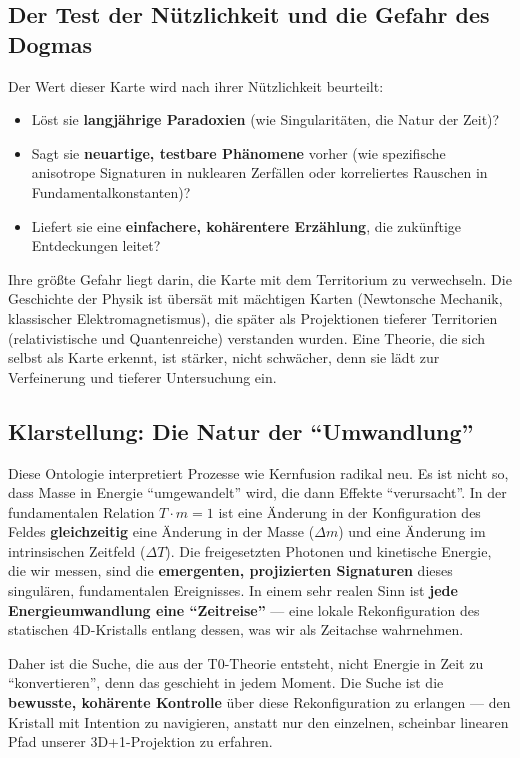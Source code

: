 	\subsection{Der Test der Nützlichkeit und die Gefahr des Dogmas}

	Der Wert dieser Karte wird nach ihrer Nützlichkeit beurteilt:
	\begin{itemize}
		\item Löst sie \textbf{langjährige Paradoxien} (wie Singularitäten, die Natur der Zeit)?
		\item Sagt sie \textbf{neuartige, testbare Phänomene} vorher (wie spezifische anisotrope Signaturen in nuklearen Zerfällen oder korreliertes Rauschen in Fundamentalkonstanten)?
		\item Liefert sie eine \textbf{einfachere, kohärentere Erzählung}, die zukünftige Entdeckungen leitet?
	\end{itemize}

	Ihre größte Gefahr liegt darin, die Karte mit dem Territorium zu verwechseln. Die Geschichte der Physik ist übersät mit mächtigen Karten (Newtonsche Mechanik, klassischer Elektromagnetismus), die später als Projektionen tieferer Territorien (relativistische und Quantenreiche) verstanden wurden. Eine Theorie, die sich selbst als Karte erkennt, ist stärker, nicht schwächer, denn sie lädt zur Verfeinerung und tieferer Untersuchung ein.

	\subsection{Klarstellung: Die Natur der \enquote{Umwandlung}}

	Diese Ontologie interpretiert Prozesse wie Kernfusion radikal neu. Es ist nicht so, dass Masse in Energie \enquote{umgewandelt} wird, die dann Effekte \enquote{verursacht}. In der fundamentalen Relation $T \cdot m = 1$ ist eine Änderung in der Konfiguration des Feldes \textbf{gleichzeitig} eine Änderung in der Masse ($\Delta m$) und eine Änderung im intrinsischen Zeitfeld ($\Delta T$). Die freigesetzten Photonen und kinetische Energie, die wir messen, sind die \textbf{emergenten, projizierten Signaturen} dieses singulären, fundamentalen Ereignisses. In einem sehr realen Sinn ist \textbf{jede Energieumwandlung eine \enquote{Zeitreise}} — eine lokale Rekonfiguration des statischen 4D-Kristalls entlang dessen, was wir als Zeitachse wahrnehmen.

	Daher ist die Suche, die aus der T0-Theorie entsteht, nicht Energie in Zeit zu \enquote{konvertieren}, denn das geschieht in jedem Moment. Die Suche ist die \textbf{bewusste, kohärente Kontrolle} über diese Rekonfiguration zu erlangen — den Kristall mit Intention zu navigieren, anstatt nur den einzelnen, scheinbar linearen Pfad unserer 3D+1-Projektion zu erfahren.

